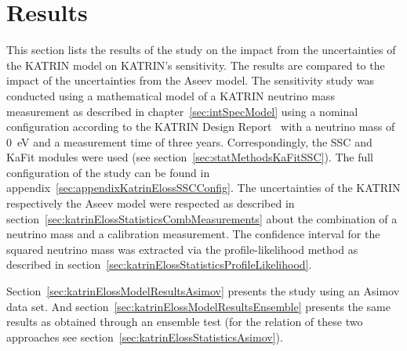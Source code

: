 \section{Results}
\label{sec:katrinElossModelResults}
This section lists the results of the study on the impact from the uncertainties of the KATRIN model on KATRIN's sensitivity. The results are compared to the impact of the uncertainties from the Aseev model. The sensitivity study was conducted using a mathematical model of a KATRIN neutrino mass measurement as described in chapter~\ref{sec:intSpecModel} using a nominal configuration according to the KATRIN Design Report~\cite{Angrik:2005ep} with a neutrino mass of \SI{0}{eV} and a measurement time of three years. Correspondingly, the SSC and KaFit modules were used (see section~\ref{sec:statMethodsKaFitSSC}). The full configuration of the study can be found in appendix~\ref{sec:appendixKatrinElossSSCConfig}. The uncertainties of the KATRIN respectively the Aseev model were respected as described in section~\ref{sec:katrinElossStatisticsCombMeasurements} about the combination of a neutrino mass and a calibration measurement. The confidence interval for the squared neutrino mass was extracted via the profile-likelihood method as described in section~\ref{sec:katrinElossStatisticsProfileLikelihood}.

Section~\ref{sec:katrinElossModelResultsAsimov} presents the study using an Asimov data set. And section~\ref{sec:katrinElossModelResultsEnsemble} presents the same results as obtained through an ensemble test (for the relation of these two approaches see section~\ref{sec:katrinElossStatisticsAsimov}).
